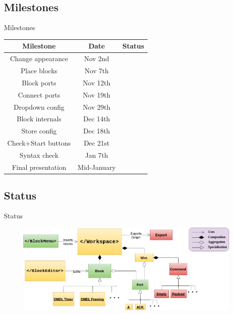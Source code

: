 \documentclass{beamer}
\begin{document}
    \subsection{Milestones}
    \begin{frame}{Milestones}
    \centering
	    \begin{tabular}{|c|c|c|} \hline
		    \textbf{Milestone} & \textbf{Date} & \textbf{Status} \\ \hline
		    Change appearance & Nov 2nd & \color{green}{Done} \\ \hline
		    Place blocks & Nov 7th & \color{green}{Done} \\ \hline
		    Block ports & Nov 12th & \color{green}{Done} \\ \hline
		    Connect ports & Nov 19th & \color{green}{Done} \\ \hline
		    Dropdown config & Nov 29th & \color{green}{Done} \\ \hline
		    Block internals & Dec 14th & \color{red}{Partly Done} \\ \hline
		    Store config & Dec 18th & \color{red}{Done} \\ \hline
		    Check+Start buttons & Dec 21st & \color{red}{Done} \\ \hline
		    Syntax check & Jan 7th & \color{red}{Done} \\ \hline
		    Final presentation & Mid-January & \color{red}{Not Done} \\ \hline
	    \end{tabular}
    \end{frame}


    \subsection{Status}
    \begin{frame}{Status}
    \centering
	    \begin{figure}
     		\includegraphics[width=\linewidth]{dmdl-editor-status.png}
     		\label{fig:uml-status}
	    \end{figure}
    \end{frame}
\fi
\end{document}
